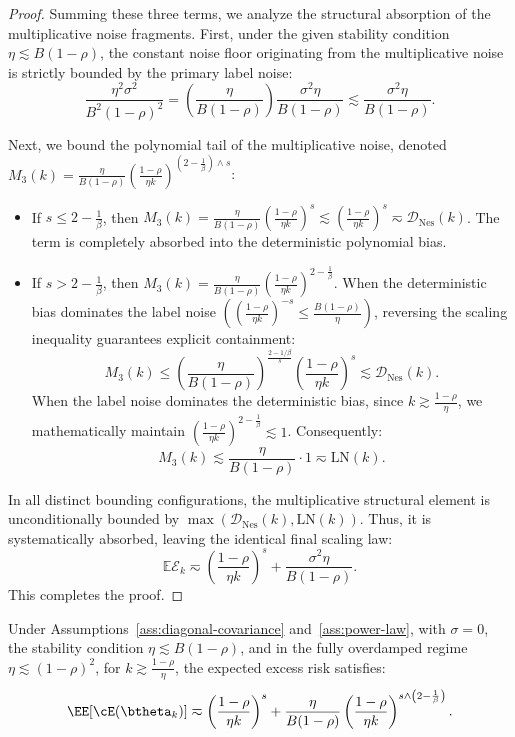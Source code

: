 \begin{proof}
Summing these three terms, we analyze the structural absorption of the multiplicative noise fragments. First, under the given stability condition $\eta \lesssim B(1-\rho)$, the constant noise floor originating from the multiplicative noise is strictly bounded by the primary label noise:
\[
    \frac{\eta^2\sigma^2}{B^2(1-\rho)^2} = \left(\frac{\eta}{B(1-\rho)}\right) \frac{\sigma^2\eta}{B(1-\rho)} \lesssim \frac{\sigma^2\eta}{B(1-\rho)}.
\]

Next, we bound the polynomial tail of the multiplicative noise, denoted $M_3(k) = \frac{\eta}{B(1-\rho)} \left(\frac{1-\rho}{\eta k}\right)^{\left(2-\frac1\beta\right)\wedge s}$:
\begin{itemize}
    \item If $s \le 2-\frac{1}{\beta}$, then $M_3(k) = \frac{\eta}{B(1-\rho)} \left(\frac{1-\rho}{\eta k}\right)^s \lesssim \left(\frac{1-\rho}{\eta k}\right)^s \eqsim \mathcal{D}_{\mathrm{Nes}}(k)$. The term is completely absorbed into the deterministic polynomial bias.
    \item If $s > 2-\frac{1}{\beta}$, then $M_3(k) = \frac{\eta}{B(1-\rho)} \left(\frac{1-\rho}{\eta k}\right)^{2-\frac{1}{\beta}}$.
    When the deterministic bias dominates the label noise $\left( \left(\frac{1-\rho}{\eta k}\right)^{-s} \le \frac{B(1-\rho)}{\eta} \right)$, reversing the scaling inequality guarantees explicit containment:
    \[
        M_3(k) \le \left(\frac{\eta}{B(1-\rho)}\right)^{\frac{2-1/\beta}{s}} \left(\frac{1-\rho}{\eta k}\right)^s \lesssim \mathcal{D}_{\mathrm{Nes}}(k).
    \]
    When the label noise dominates the deterministic bias, since $k \gtrsim \frac{1-\rho}{\eta}$, we mathematically maintain $\left(\frac{1-\rho}{\eta k}\right)^{2-\frac{1}{\beta}} \lesssim 1$. Consequently:
    \[
        M_3(k) \lesssim \frac{\eta}{B(1-\rho)} \cdot 1 \eqsim \text{LN}(k).
    \]
\end{itemize}
In all distinct bounding configurations, the multiplicative structural element is unconditionally bounded by $\max(\mathcal{D}_{\mathrm{Nes}}(k), \text{LN}(k))$. Thus, it is systematically absorbed, leaving the identical final scaling law:
\[
    \mathbb{E}\mathcal E_k
    \eqsim
    \left(\frac{1-\rho}{\eta k}\right)^s
    +
    \frac{\sigma^2\eta}{B(1-\rho)}.
\]
This completes the proof.
\end{proof}

\begin{theorem}
\label{thm:nes_scaling_sgd_noiseless}
Under Assumptions~\ref{ass:diagonal-covariance} and~\ref{ass:power-law}, with \(\sigma=0\), the stability condition \(\eta \lesssim B(1-\rho)\), and in the fully overdamped regime \(\eta\lesssim(1-\rho)^2\), for \(k \gtrsim \frac{1-\rho}{\eta}\), the expected excess risk satisfies:
\begin{equation}
\label{eq:nes_scaling_sgd_noiseless}
    \EE[\cE(\btheta_k)]
    \eqsim
    \left(\frac{1-\rho}{\eta k}\right)^s
    +
    \frac{\eta}{B(1-\rho)}
    \left(\frac{1-\rho}{\eta k}\right)^{s \wedge \left(2-\frac1\beta\right)}.
\end{equation}
\end{theorem}

